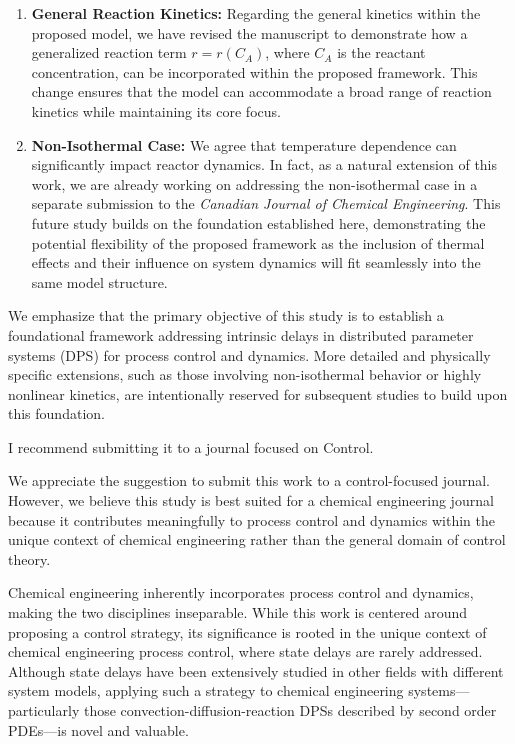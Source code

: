 \documentclass[11pt,answers]{exam}
\begin{document}
\begin{questions}
\begin{solutionorbox}
        \begin{enumerate}
            \item \textbf{General Reaction Kinetics:} Regarding the general kinetics within the proposed model, we have revised the manuscript to demonstrate how a generalized reaction term \( r = r(C_A) \), where \( C_A \) is the reactant concentration, can be incorporated within the proposed framework. This change ensures that the model can accommodate a broad range of reaction kinetics while maintaining its core focus.
            
            \item \textbf{Non-Isothermal Case:} We agree that temperature dependence can significantly impact reactor dynamics. In fact, as a natural extension of this work, we are already working on addressing the non-isothermal case in a separate submission to the \textit{Canadian Journal of Chemical Engineering}. This future study builds on the foundation established here, demonstrating the potential flexibility of the proposed framework as the inclusion of thermal effects and their influence on system dynamics will fit seamlessly into the same model structure.
        \end{enumerate}

        We emphasize that the primary objective of this study is to establish a foundational framework addressing intrinsic delays in distributed parameter systems (DPS) for process control and dynamics. More detailed and physically specific extensions, such as those involving non-isothermal behavior or highly nonlinear kinetics, are intentionally reserved for subsequent studies to build upon this foundation.       
    \end{solutionorbox}


    \question I recommend submitting it to a journal focused on Control.

    \begin{solutionorbox} \label{comment:2_4}
        We appreciate the suggestion to submit this work to a control-focused journal. However, we believe this study is best suited for a chemical engineering journal because it contributes meaningfully to process control and dynamics within the unique context of chemical engineering rather than the general domain of control theory.

        Chemical engineering inherently incorporates process control and dynamics, making the two disciplines inseparable. While this work is centered around proposing a control strategy, its significance is rooted in the unique context of chemical engineering process control, where state delays are rarely addressed. Although state delays have been extensively studied in other fields with different system models, applying such a strategy to chemical engineering systems—particularly those convection-diffusion-reaction DPSs described by second order PDEs—is novel and valuable. 
        

\end{solutionorbox}
\end{questions}
\end{document}
